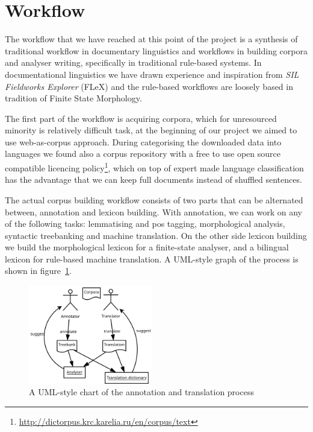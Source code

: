 \documentclass{flammie}
\begin{document}
\section{Workflow}\label{sec:workflow}

The workflow that we have reached at this point of the project is a synthesis
of traditional workflow in documentary linguistics and workflows in building
corpora and analyser writing, specifically in traditional rule-based systems.
In documentational linguistics we have drawn experience and inspiration from
\textit{SIL Fieldworks Explorer} (FLeX) and the rule-based workflows are
loosely based in tradition of Finite State Morphology.

The first part of the workflow is acquiring corpora, which for unresourced
minority is relatively difficult task, at the beginning of our project we aimed
to use web-as-corpus approach. During categorising the downloaded data
into languages we found also a corpus repository with a free to use open source
compatible licencing
policy\footnote{\url{http://dictorpus.krc.karelia.ru/en/corpus/text}}, which on
top of expert made language classification has the advantage that we can keep
full documents instead of shuffled sentences.


The actual corpus building workflow consists of two parts that can be
alternated between, annotation and lexicon building. With annotation, we can
work on any of the following tasks: lemmatising and pos tagging, morphological
analysis, syntactic treebanking and machine translation. On the other side
lexicon building we build the morphological lexicon for a finite-state analyser,
and a bilingual lexicon for rule-based machine translation. A UML-style
graph of the process is shown in figure~\ref{fig:translation}.

\begin{figure}
    \includegraphics[width=0.48\textwidth]{process-uml}
    \caption{A UML-style chart of the annotation and translation
    process\label{fig:translation}}
\end{figure}
\end{document}
